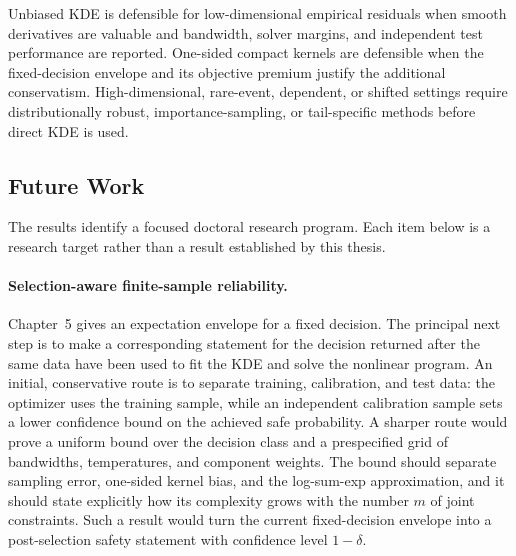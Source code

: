Unbiased KDE is defensible for low-dimensional empirical residuals when smooth
derivatives are valuable and bandwidth, solver margins, and independent test
performance are reported. One-sided compact kernels are defensible when the
fixed-decision envelope and its objective premium justify the additional
conservatism. High-dimensional, rare-event, dependent, or shifted settings
require distributionally robust, importance-sampling, or tail-specific methods
before direct KDE is used.

\subsection{Future Work}\label{sec:discussion-future-work}

The results identify a focused doctoral research program. Each item below is a
research target rather than a result established by this thesis.

\paragraph*{Selection-aware finite-sample reliability.}
Chapter~5 gives an expectation envelope for a fixed decision. The principal next
step is to make a corresponding statement for the decision returned after the
same data have been used to fit the KDE and solve the nonlinear program. An
initial, conservative route is to separate training, calibration, and test data:
the optimizer uses the training sample, while an independent calibration sample
sets a lower confidence bound on the achieved safe probability. A sharper route
would prove a uniform bound over the decision class and a prespecified grid of
bandwidths, temperatures, and component weights. The bound should separate
sampling error, one-sided kernel bias, and the log-sum-exp approximation, and it
should state explicitly how its complexity grows with the number $m$ of joint
constraints. Such a result would turn the current fixed-decision envelope into a
post-selection safety statement with confidence level $1-\delta$.

